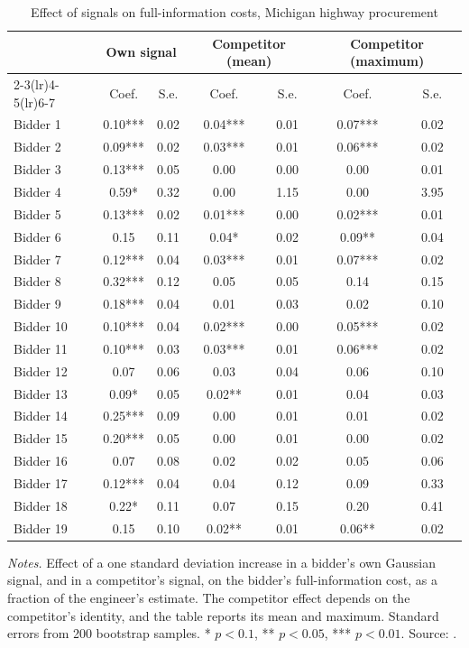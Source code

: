\begin{table}[htbp]
\centering
\caption{Effect of signals on full-information costs, Michigan highway procurement}\label{tab:15-somaini-signals}
\small
\begin{tabular}{@{}lcccccc@{}}
\toprule
 & \multicolumn{2}{c}{Own signal} & \multicolumn{2}{c}{Competitor (mean)} & \multicolumn{2}{c}{Competitor (maximum)} \\
\cmidrule(lr){2-3}\cmidrule(lr){4-5}\cmidrule(lr){6-7}
 & Coef. & S.e. & Coef. & S.e. & Coef. & S.e. \\
\midrule
Bidder 1 & 0.10*** & 0.02 & 0.04*** & 0.01 & 0.07*** & 0.02 \\
Bidder 2 & 0.09*** & 0.02 & 0.03*** & 0.01 & 0.06*** & 0.02 \\
Bidder 3 & 0.13*** & 0.05 & 0.00 & 0.00 & 0.00 & 0.01 \\
Bidder 4 & 0.59* & 0.32 & 0.00 & 1.15 & 0.00 & 3.95 \\
Bidder 5 & 0.13*** & 0.02 & 0.01*** & 0.00 & 0.02*** & 0.01 \\
Bidder 6 & 0.15 & 0.11 & 0.04* & 0.02 & 0.09** & 0.04 \\
Bidder 7 & 0.12*** & 0.04 & 0.03*** & 0.01 & 0.07*** & 0.02 \\
Bidder 8 & 0.32*** & 0.12 & 0.05 & 0.05 & 0.14 & 0.15 \\
Bidder 9 & 0.18*** & 0.04 & 0.01 & 0.03 & 0.02 & 0.10 \\
Bidder 10 & 0.10*** & 0.04 & 0.02*** & 0.00 & 0.05*** & 0.02 \\
Bidder 11 & 0.10*** & 0.03 & 0.03*** & 0.01 & 0.06*** & 0.02 \\
Bidder 12 & 0.07 & 0.06 & 0.03 & 0.04 & 0.06 & 0.10 \\
Bidder 13 & 0.09* & 0.05 & 0.02** & 0.01 & 0.04 & 0.03 \\
Bidder 14 & 0.25*** & 0.09 & 0.00 & 0.01 & 0.01 & 0.02 \\
Bidder 15 & 0.20*** & 0.05 & 0.00 & 0.01 & 0.00 & 0.02 \\
Bidder 16 & 0.07 & 0.08 & 0.02 & 0.02 & 0.05 & 0.06 \\
Bidder 17 & 0.12*** & 0.04 & 0.04 & 0.12 & 0.09 & 0.33 \\
Bidder 18 & 0.22* & 0.11 & 0.07 & 0.15 & 0.20 & 0.41 \\
Bidder 19 & 0.15 & 0.10 & 0.02** & 0.01 & 0.06** & 0.02 \\
\bottomrule
\end{tabular}

\smallskip
\begin{minipage}{0.92\textwidth}
\footnotesize \textit{Notes.} Effect of a one standard deviation increase in a bidder's own Gaussian signal, and in a
competitor's signal, on the bidder's full-information cost, as a fraction of the engineer's estimate. The
competitor effect depends on the competitor's identity, and the table reports its mean and maximum. Standard
errors from 200 bootstrap samples. * $p<0.1$, ** $p<0.05$, *** $p<0.01$. Source: \citet[Table~7]{Somaini2020}.
\end{minipage}
\end{table}


